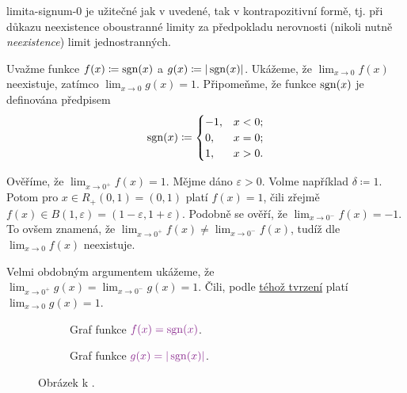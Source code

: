 \begin{example}{}{limita-signum-0}
  je užitečné
 jak v uvedené, tak v kontrapozitivní formě, tj. při důkazu neexistence
 oboustranné limity za předpokladu nerovnosti (nikoli nutně \emph{neexistence})
 limit jednostranných.

 Uvažme funkce $f(x) \coloneqq \operatorname{sgn}(x)$ a $g(x) \coloneqq |\operatorname{sgn}(x)|$. Ukážeme,
 že $\lim_{x \to 0} f(x)$ neexistuje, zatímco $\lim_{x \to 0} g(x) = 1$.
 Připomeňme, že funkce $\operatorname{sgn}(x)$ je definována předpisem
 \[
  \operatorname{sgn}(x) \coloneqq \begin{cases}
   -1, & x < 0;\\
   0, & x = 0;\\
   1, & x > 0.
  \end{cases}
 \]

 Ověříme, že $\lim_{x \to 0^{+}} f(x) = 1$. Mějme dáno $\varepsilon>0$. Volme
 například $\delta \coloneqq 1$. Potom pro $x \in R_+(0,1) = (0,1)$ platí $f(x)
 = 1$, čili zřejmě $f(x) \in B(1,\varepsilon) = (1-\varepsilon,1+\varepsilon)$.
 Podobně se ověří, že $\lim_{x \to 0^{-}} f(x) = -1$. To ovšem znamená, že
 $\lim_{x \to 0^{+}} f(x) \neq \lim_{x \to 0^{-}} f(x)$, tudíž dle
  $\lim_{x \to
 0} f(x)$ neexistuje.

 Velmi obdobným argumentem ukážeme, že $\lim_{x \to 0^{+}} g(x) = \lim_{x \to
 0^{-}} g(x) = 1$. Čili, podle
 \hyperref[prop:vztah-jednostrannych-a-oboustrannych-limit]{téhož tvrzení} platí
 $\lim_{x \to 0} g(x) = 1$.
\end{example}

\begin{figure}[ht]
 \centering
 \begin{subfigure}[b]{0.49\textwidth}
  \centering
  \caption{Graf funkce $\clm{f(x) = \sign(x)}$.}
 \end{subfigure}
 \begin{subfigure}[b]{0.49\textwidth}
  \centering
  \caption{Graf funkce $\clm{g(x) = |\sign(x)|}$.}
 \end{subfigure}
 \caption{Obrázek k .}
 \label{fig:limita-signum-0}
\end{figure}


